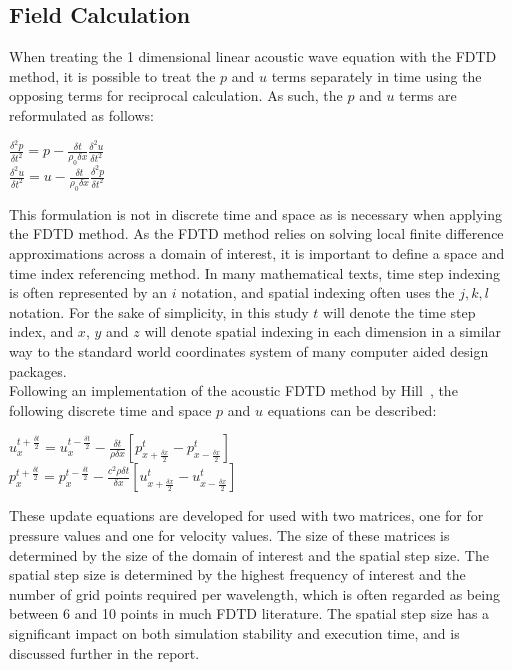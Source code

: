 \subsection{Field Calculation}
When treating the 1 dimensional linear acoustic wave equation with the FDTD method, it is possible to treat the $p$ and $u$ terms separately in time using the opposing terms for reciprocal calculation. As such, the $p$ and $u$ terms are reformulated as follows:\\
\begin{center}
$\frac{\delta^2 p}{\delta t^2} = p - \frac{\delta t}{\rho_0 \delta x} \frac{\delta^2 u}{\delta t^{2}}$\\
$\frac{\delta^2 u}{\delta t^2} = u - \frac{\delta t}{\rho_0 \delta x} \frac{\delta^2 p}{\delta t^{2}}$\\
\end{center}
This formulation is not in discrete time and space as is necessary when applying the FDTD method. As the FDTD method relies on solving local finite difference approximations across a domain of interest, it is important to define a space and time index referencing method. In many mathematical texts, time step indexing is often represented by an $i$ notation, and spatial indexing often uses the $j,k,l$ notation. For the sake of simplicity, in this study $t$ will denote the time step index, and $x$, $y$ and $z$ will denote spatial indexing in each dimension in a similar way to the standard world coordinates system of many computer aided design packages.\\
Following an implementation of the acoustic FDTD method by Hill~\cite{Hill2012}, the following discrete time and space $p$ and $u$ equations can be described:\\
\begin{center}
$u^{t + \frac{\delta t}{2}}_{x} = u^{t - \frac{\delta t}{2}}_{x} - \frac{\delta t}{\rho \delta x} \left[p^{t}_{x + \frac{\delta x}{2}} - p^{t}_{x - \frac{\delta x}{2}}\right]$\\
$p^{t + \frac{\delta t}{2}}_{x} = p^{t - \frac{\delta t}{2}}_{x} - \frac{c^2 \rho \delta t}{\delta x} \left[u^{t}_{x + \frac{\delta x}{2}} - u^{t}_{x - \frac{\delta x}{2}}\right]$\\
\end{center}
These update equations are developed for used with two matrices, one for for pressure values and one for velocity values. The size of these matrices is determined by the size of the domain of interest and the spatial step size. The spatial step size is determined by the highest frequency of interest and the number of grid points required per wavelength, which is often regarded as being between 6 and 10 points in much FDTD literature. The spatial step size has a significant impact on both simulation stability and execution time, and is discussed further in the report.
\newpage
